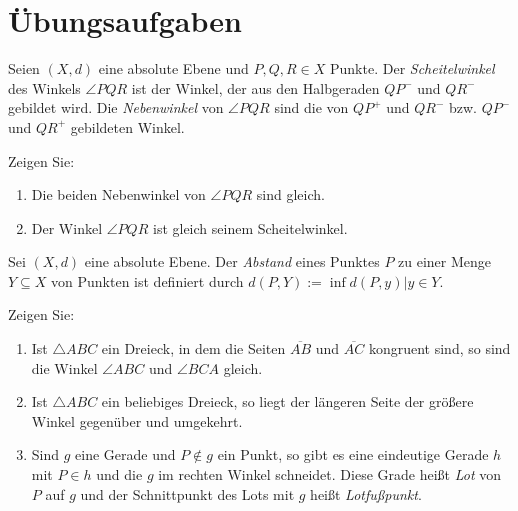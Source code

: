 \clearpage
\section*{Übungsaufgaben}

\begin{aufgabe}\label{ub11:aufg1}
    Seien $(X, d)$ eine absolute Ebene und $P, Q, R \in X$ Punkte.
    Der \textit{Scheitelwinkel} des Winkels $\angle PQR$ ist
    der Winkel, der aus den Halbgeraden $QP^-$ und $QR^-$ gebildet
    wird. Die \textit{Nebenwinkel} von $\angle PQR$
    sind die von $QP^+$ und $QR^-$ bzw. $QP^-$ und $QR^+$ gebildeten
    Winkel.

    Zeigen Sie:
    \begin{enumerate}[label=(\alph*)]
        \item Die beiden Nebenwinkel von $\angle PQR$ sind gleich.
        \item Der Winkel $\angle PQR$ ist gleich seinem Scheitelwinkel.
    \end{enumerate}
\end{aufgabe}

\begin{aufgabe}\label{ub11:aufg3}
    Sei $(X, d)$ eine absolute Ebene. Der \textit{Abstand} eines 
    Punktes $P$ zu einer Menge $Y \subseteq X$ von Punkten ist
    definiert durch $d(P, Y) := \inf{d(P, y) | y \in Y}$.

    Zeigen Sie:
    \begin{enumerate}[label=(\alph*),ref=\theenumi{} (\alph*)]
        \item Ist $\triangle ABC$ ein Dreieck, in dem die Seiten
              $\overline{AB}$ und $\overline{AC}$ kongruent sind, so
              sind die Winkel $\angle ABC$ und $\angle BCA$ gleich.
        \item Ist $\triangle ABC$ ein beliebiges Dreieck, so liegt 
              der längeren Seite der größere Winkel gegenüber und
              umgekehrt.
        \item \label{ub11:aufg3.c} Sind $g$ eine Gerade und $P \notin g$ ein Punkt, so gibt
              es eine eindeutige Gerade $h$ mit $P \in h$ und die
              $g$ im rechten Winkel schneidet. Diese Grade heißt 
              \textit{Lot} von $P$ auf $g$ und der 
              Schnittpunkt des Lots mit $g$ heißt \textit{Lotfußpunkt}.
    \end{enumerate}
\end{aufgabe}
